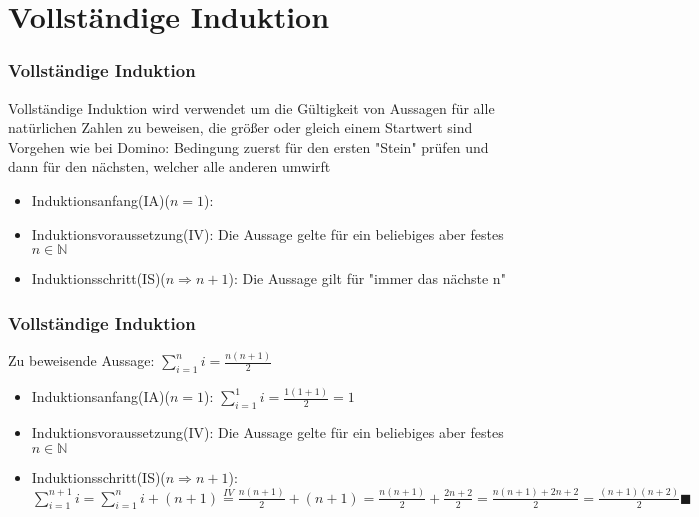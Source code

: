 \section{Vollständige Induktion}
\begin{frame}
    \frametitle{Vollständige Induktion}
    Vollständige Induktion wird verwendet um die Gültigkeit von Aussagen für alle natürlichen Zahlen zu beweisen, die größer oder gleich einem Startwert sind
    \vfill
     Vorgehen wie bei Domino:
        \newline Bedingung zuerst für den ersten "Stein" prüfen und dann für den nächsten, welcher alle anderen umwirft
    \begin{itemize}
        
        \vfill \item Induktionsanfang(IA)($n=1$):
        \vfill \item Induktionsvoraussetzung(IV):
                \newline Die Aussage gelte für ein beliebiges aber festes $n \in \mathbb{N}$
        \vfill \item Induktionsschritt(IS)($n \Rightarrow n+1$):
        \newline Die Aussage gilt für "immer das nächste n"

    \end{itemize}
\end{frame}

\begin{frame}
    \frametitle{Vollständige Induktion}
    Zu beweisende Aussage: $\sum_{i=1}^{n} i = \frac{n(n+1)}{2}$
    \vfill
    \begin{itemize}
        \vfill \item Induktionsanfang(IA)($n=1$):
                \newline $\sum_{i=1}^{1} i = \frac{1(1+1)}{2} = 1$
        \vfill \item Induktionsvoraussetzung(IV):
                \newline Die Aussage gelte für ein beliebiges aber festes $n \in \mathbb{N}$
        \vfill \item Induktionsschritt(IS)($n \Rightarrow n+1$):
                \newline $\sum_{i=1}^{n+1} i = \sum_{i=1}^{n} i + (n+1) \stackrel{IV}{=} \frac{n(n+1)}{2} + (n+1) = \frac{n(n+1)}{2} + \frac{2n+2}{2} = \frac{n(n+1)+2n+2}{2} = \frac{(n+1)(n+2)}{2} \blacksquare$

    \end{itemize}
\end{frame}

